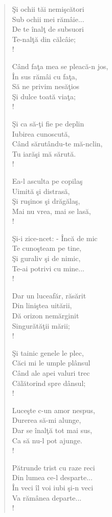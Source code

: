 \documentclass{article}
\begin{document}
\begin{small}
\begin{multicols}{3}
\begin{verse}
Şi ochii tăi nemişcători \\
Sub ochii mei rămâie... \\
De te înalţ de subsuori \\
Te-nalţă din călcâie; \\!

Când faţa mea se pleacă-n jos, \\
În sus rămâi cu faţa, \\
Să ne privim nesăţios \\
Şi dulce toată viaţa; \\!

Şi ca să-ţi fie pe deplin \\
Iubirea cunoscută, \\
Când sărutându-te mă-nclin, \\
Tu iarăşi mă sărută. \\!

Ea-l asculta pe copilaş \\
Uimită şi distrasă, \\
Şi ruşinos şi drăgălaş, \\
Mai nu vrea, mai se lasă, \\!

Şi-i zice-ncet: - Încă de mic \\
Te cunoşteam pe tine, \\
Şi guraliv şi de nimic, \\
Te-ai potrivi cu mine... \\!

Dar un luceafăr, răsărit \\
Din liniştea uitării, \\
Dă orizon nemărginit \\
Singurătăţii mării; \\!

Şi tainic genele le plec, \\
Căci mi le umple plânsul \\
Când ale apei valuri trec \\
Călătorind spre dânsul; \\!

Luceşte c-un amor nespus, \\
Durerea să-mi alunge, \\
Dar se înalţă tot mai sus, \\
Ca să nu-l pot ajunge. \\!

Pătrunde trist cu raze reci \\
Din lumea ce-l desparte... \\
În veci îl voi iubi şi-n veci \\
Va rămânea departe... \\!


\end{verse}
\end{multicols}
\end{small}
\end{document}
